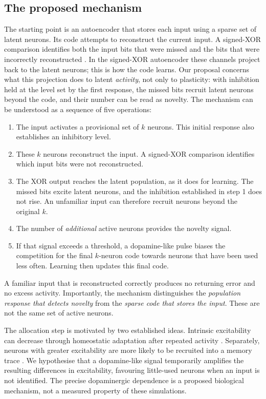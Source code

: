 \documentclass[11pt,a4paper]{article}
\begin{document}
\subsection*{The proposed mechanism}
The starting point is an autoencoder that stores each input using a sparse set of latent neurons. Its code attempts to reconstruct the current input. A signed-XOR comparison identifies both the input bits that were missed and the bits that were incorrectly reconstructed \citep{pena2026loss}. In the signed-XOR autoencoder these channels project back to the latent neurons; this is how the code learns. Our proposal concerns what this projection does to latent \emph{activity}, not only to plasticity: with inhibition held at the level set by the first response, the missed bits recruit latent neurons beyond the code, and their number can be read as novelty. The mechanism can be understood as a sequence of five operations:
\begin{enumerate}[label=\arabic*.]
\item The input activates a provisional set of $k$ neurons. This initial response also establishes an inhibitory level.
\item These $k$ neurons reconstruct the input. A signed-XOR comparison identifies which input bits were not reconstructed.
\item The XOR output reaches the latent population, as it does for learning. The missed bits excite latent neurons, and the inhibition established in step 1 does not rise. An unfamiliar input can therefore recruit neurons beyond the original $k$.
\item The number of \emph{additional} active neurons provides the novelty signal.
\item If that signal exceeds a threshold, a dopamine-like pulse biases the competition for the final $k$-neuron code towards neurons that have been used less often. Learning then updates this final code.
\end{enumerate}
A familiar input that is reconstructed correctly produces no returning error and no excess activity. Importantly, the mechanism distinguishes the \emph{population response that detects novelty} from the \emph{sparse code that stores the input}. These are not the same set of active neurons.

The allocation step is motivated by two established ideas. Intrinsic excitability can decrease through homeostatic adaptation after repeated activity \citep{desai1999,turrigiano2008}. Separately, neurons with greater excitability are more likely to be recruited into a memory trace \citep{josselyn2018,yiu2014}. We hypothesise that a dopamine-like signal temporarily amplifies the resulting differences in excitability, favouring little-used neurons when an input is not identified. The precise dopaminergic dependence is a proposed biological mechanism, not a measured property of these simulations.
\end{document}
